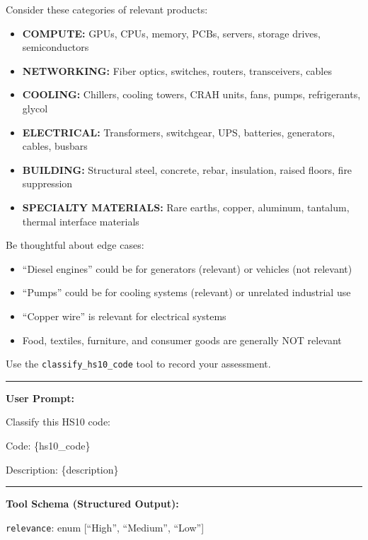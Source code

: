 \documentclass[12pt,pdftex]{article}
\newenvironment{prompt}{\par\medskip\noindent}{\par\medskip}
\begin{document}
\begin{onehalfspacing}
\begin{prompt}
\medskip

Consider these categories of relevant products:

\begin{itemize}
    \item \textbf{COMPUTE:} GPUs, CPUs, memory, PCBs, servers, storage drives, semiconductors
    \item \textbf{NETWORKING:} Fiber optics, switches, routers, transceivers, cables
    \item \textbf{COOLING:} Chillers, cooling towers, CRAH units, fans, pumps, refrigerants, glycol
    \item \textbf{ELECTRICAL:} Transformers, switchgear, UPS, batteries, generators, cables, busbars
    \item \textbf{BUILDING:} Structural steel, concrete, rebar, insulation, raised floors, fire suppression
    \item \textbf{SPECIALTY MATERIALS:} Rare earths, copper, aluminum, tantalum, thermal interface materials
\end{itemize}

\medskip

Be thoughtful about edge cases:
\begin{itemize}
    \item ``Diesel engines'' could be for generators (relevant) or vehicles (not relevant)
    \item ``Pumps'' could be for cooling systems (relevant) or unrelated industrial use
    \item ``Copper wire'' is relevant for electrical systems
    \item Food, textiles, furniture, and consumer goods are generally NOT relevant
\end{itemize}

\medskip

Use the \texttt{classify\_hs10\_code} tool to record your assessment.

\bigskip
\hrule
\bigskip

\textbf{User Prompt:}

\medskip

Classify this HS10 code:

Code: \{hs10\_code\}

Description: \{description\}

\bigskip
\hrule
\bigskip

\textbf{Tool Schema (Structured Output):}

\medskip

\texttt{relevance}: enum [``High'', ``Medium'', ``Low'']


\end{prompt}
\end{onehalfspacing}
\end{document}
